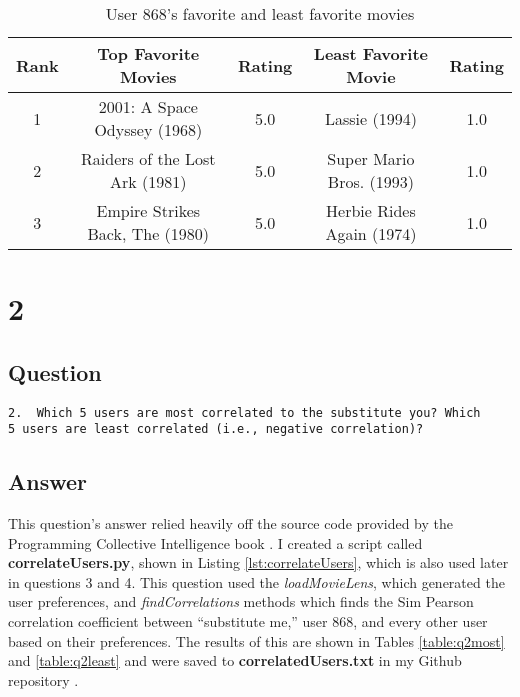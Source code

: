 \documentclass[letterpaper,11pt]{article}
\newcommand*{\srcPath}{../src}%
\begin{document}
\begin{table}[htb]
\begin{tabular}{ | c | c | c | | c | c |}
\hline
\textbf{Rank} & \textbf{Top Favorite Movies} & \textbf{Rating} & \textbf{Least Favorite Movie} & \textbf{Rating} \\
\hline
1 & 2001: A Space Odyssey (1968) & 5.0 & Lassie (1994) & 1.0 \\
\hline
2 & Raiders of the Lost Ark (1981) & 5.0 & Super Mario Bros. (1993) & 1.0 \\
\hline
3 & Empire Strikes Back, The (1980) & 5.0 & Herbie Rides Again (1974) & 1.0 \\
\hline
\end{tabular}
\caption{User 868's favorite and least favorite movies}
\label{table:q1user3}
\end{table}

 


\clearpage


\section*{2}

\subsection*{Question}

\begin{verbatim}
2.  Which 5 users are most correlated to the substitute you? Which
5 users are least correlated (i.e., negative correlation)?
\end{verbatim}

\subsection*{Answer}

This question's answer relied heavily off the source code provided by the Programming Collective Intelligence book \cite{collectiveIntell}. I created a script called \textbf{correlateUsers.py}, shown in Listing \ref{lst:correlateUsers}, which is also used later in questions 3 and 4. This question used the \textit{loadMovieLens}, which generated the user preferences, and \textit{findCorrelations} methods which finds the Sim Pearson correlation coefficient between ``substitute me,'' user 868, and every other user based on their preferences. The results of this are shown in Tables \ref{table:q2most} and \ref{table:q2least} and were saved to \textbf{correlatedUsers.txt} in my Github repository \cite{github}.
\end{document}
